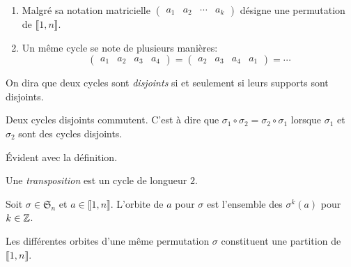 \begin{rems}
  \begin{enumerate}
    \item Malgré sa notation matricielle 
     $\begin{pmatrix}
        a_1 & a_2 & \cdots & a_k
     \end{pmatrix}$ désigne une permutation de $\llbracket 1,n \rrbracket$.
     \item Un même cycle se note de plusieurs manières:
\[
  \begin{pmatrix}a_1 & a_2 & a_3 & a_4 \end{pmatrix} = \begin{pmatrix}a_2 & a_3 & a_4 & a_1 \end{pmatrix} = \cdots 
\]
  \end{enumerate}
\end{rems}

\begin{defi}
 On dira que deux cycles sont \emph{disjoints} si et seulement si leurs supports sont disjoints.
\end{defi}
\begin{propn}
 Deux cycles disjoints commutent. C'est à dire que $\sigma_1 \circ \sigma_2 = \sigma_2 \circ \sigma_1 $ lorsque $\sigma_1$ et $\sigma_2$ sont des cycles disjoints.
\end{propn}
\begin{demo}
 \'Evident avec la définition.
\end{demo}
\begin{defi}
Une \emph{transposition} est un cycle de longueur $2$. 
\end{defi}
\begin{defi}
Soit $\sigma \in \mathfrak{S}_n$ et $a\in \llbracket 1,n \rrbracket$. L'orbite de $a$ pour $\sigma$ est l'ensemble des $\sigma^k(a)$ pour $k\in \mathbb{Z}$.  
\end{defi}
\begin{propn}
  Les différentes orbites d'une même permutation $\sigma$ constituent une partition de $\llbracket 1,n \rrbracket$.
\end{propn}
\clearpage

